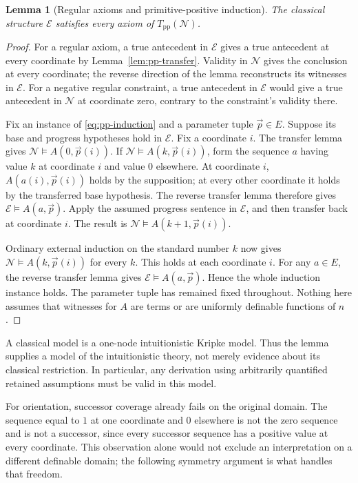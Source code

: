 \documentclass[11pt,letterpaper]{article}
\newtheorem{lemma}[theorem]{Lemma}
\theoremstyle{definition}\newtheorem{definition}[theorem]{Definition}
\theoremstyle{remark}\newtheorem{remark}[theorem]{Remark}
\begin{document}
\begin{lemma}[Regular axioms and primitive-positive induction]
\label{lem:pp-model}
The classical structure $\mathcal E$ satisfies every axiom of
$T_{\mathrm{pp}}(\mathcal N)$.
\end{lemma}
\begin{proof}
For a regular axiom, a true antecedent in $\mathcal E$ gives a true
antecedent at every coordinate by Lemma~\ref{lem:pp-transfer}.  Validity
in $\mathcal N$ gives the conclusion at every coordinate; the reverse
direction of the lemma reconstructs its witnesses in $\mathcal E$.
For a negative regular constraint, a true antecedent in $\mathcal E$
would give a true antecedent in $\mathcal N$ at coordinate zero,
contrary to the constraint's validity there.

Fix an instance of \eqref{eq:pp-induction} and a parameter tuple
$\vec p\in E$.  Suppose its base and progress hypotheses hold in
$\mathcal E$.  Fix a coordinate $i$.  The transfer lemma gives
$\mathcal N\models A(0,\vec p(i))$.  If
$\mathcal N\models A(k,\vec p(i))$, form the sequence $a$
having value $k$ at coordinate $i$ and value $0$ elsewhere.  At
coordinate $i$, $A(a(i),\vec p(i))$ holds by the supposition;
at every other coordinate it holds by the transferred base hypothesis.
The reverse transfer lemma therefore gives
$\mathcal E\models A(a,\vec p)$.  Apply the assumed progress
sentence in $\mathcal E$, and then transfer back at coordinate $i$.
The result is
$\mathcal N\models A(k+1,\vec p(i))$.

Ordinary external induction on the standard number $k$ now gives
$\mathcal N\models A(k,\vec p(i))$ for every $k$.  This holds
at each coordinate $i$.  For any $a\in E$, the reverse transfer
lemma gives $\mathcal E\models A(a,\vec p)$.  Hence the whole
induction instance holds.  The parameter tuple has remained fixed
throughout.  Nothing here assumes that witnesses for $A$ are terms or
are uniformly definable functions of $n$.
\end{proof}

A classical model is a one-node intuitionistic Kripke model.  Thus the
lemma supplies a model of the intuitionistic theory, not merely evidence
about its classical restriction.  In particular, any derivation using
arbitrarily quantified retained assumptions must be valid in this model.

For orientation, successor coverage already fails on the original
domain.  The sequence equal to $1$ at one coordinate and $0$ elsewhere
is not the zero sequence and is not a successor, since every successor
sequence has a positive value at every coordinate.  This observation
alone would not exclude an interpretation on a different definable
domain; the following symmetry argument is what handles that freedom.
\end{document}
